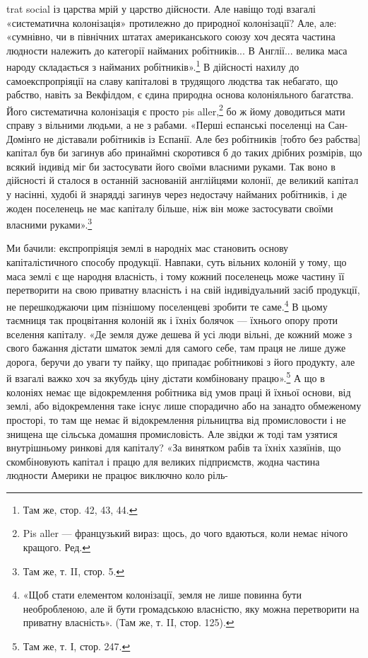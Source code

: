 trat social із царства мрій у царство дійсности. Але навіщо тоді взагалі «систематична колонізація»
протилежно до природної колонізації? Але, але: «сумнівно, чи в північних штатах американського союзу
хоч десята частина людности належить до категорії найманих робітників... В Англії... велика маса
народу складається з найманих робітників».\footnote{
Там же, стор. 42, 43, 44.
} В дійсності нахилу до самоекспропріяції на славу
капіталові в трудящого людства так небагато, що рабство, навіть за Векфілдом, є єдина природна
основа колоніяльного багатства. Його систематична колонізація є просто pis aller,\footnote*{
Pis aller — французький вираз: щось, до чого вдаються, коли немає нічого кращого. Ред.
} бо ж йому
доводиться мати справу з вільними людьми, а не з рабами. «Перші еспанські поселенці на Сан-Домінґо
не діставали робітників із Еспанії. Але без робітників [тобто без рабства] капітал був би загинув
або принаймні скоротився б до таких дрібних розмірів, що всякий індивід міг би застосувати його
своїми власними руками. Так воно в дійсності й сталося в останній заснованій англійцями колонії, де
великий капітал у насінні, худобі й знарядді загинув через недостачу найманих робітників, і де жоден
поселенець не має капіталу більше, ніж він може застосувати своїми власними руками».\footnote{
Там же, т. II, стор. 5.
}

Ми бачили: експропріяція землі в народніх мас становить основу капіталістичного способу продукції.
Навпаки, суть вільних колоній у тому, що маса землі є ще народня власність, і тому кожний поселенець
може частину її перетворити на свою приватну власність і на свій індивідуальний засіб продукції, не
перешкоджаючи цим пізнішому поселенцеві зробити те саме.\footnote{
«Щоб стати елементом колонізації, земля не лише повинна бути необробленою, але й бути
громадською власністю, яку можна перетворити на приватну власність». (Там же, т. II, стор. 125).
} В цьому таємниця так процвітання колоній
як і їхніх болячок — їхнього опору проти вселення капіталу. «Де земля дуже дешева й усі люди вільні,
де кожний може з свого бажання дістати шматок землі для самого себе, там праця не лише дуже дорога,
беручи до уваги ту пайку, що припадає робітникові з його продукту, але й взагалі важко хоч за
якубудь ціну дістати комбіновану працю».\footnote{
Там же, т. І, стор. 247.
} А що в колоніях немає ще відокремлення робітника від
умов праці й їхньої основи, від землі, або відокремлення таке існує лише спорадично або на занадто
обмеженому просторі, то там ще немає й відокремлення рільництва від промисловости і не знищена ще
сільська домашня промисловість. Але звідки ж тоді там узятися внутрішньому ринкові для капіталу? «За
винятком рабів та їхніх хазяїнів, що скомбіновують капітал і працю для великих підприємств, жодна
частина людности Америки не працює виключно коло ріль-